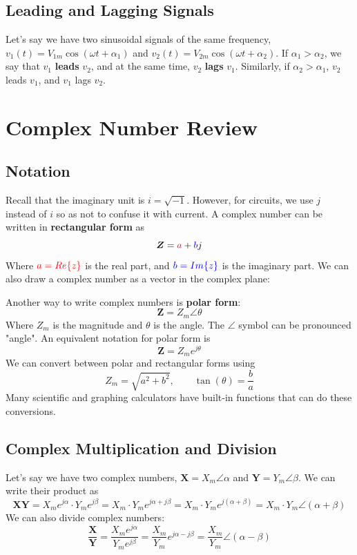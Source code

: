 \documentclass{article}
\begin{document}
\subsection*{Leading and Lagging Signals}
Let's say we have two sinusoidal signals of the same frequency, $v_1(t) = V_{1m}\cos(\omega t + \alpha_1)$ and $v_2(t) = V_{2m}\cos(\omega t + \alpha_2)$.
If $\alpha_1 > \alpha_2$, we say that $v_1$ \textbf{leads} $v_2$, and at the same time, $v_2$ \textbf{lags} $v_1$. Similarly, if $\alpha_2 > \alpha_1$, $v_2$ leads $v_1$, and $v_1$ lags $v_2$.


\section{Complex Number Review}
\subsection{Notation}
Recall that the imaginary unit is $i = \sqrt{-1}$. However, for circuits, we use $j$ instead of $i$ so as not to confuse it with current. A complex number can be written in \textbf{rectangular form} as
$$\bm{Z} = \mathcolor{red}{a} + \mathcolor{blue}{b}j$$
Where $ \mathcolor{red}{a = Re\{z\}}$ is the real part, and $\mathcolor{blue}{b = Im\{z\}}$ is the imaginary part. We can also draw a complex number as a vector in the complex plane:
\begin{figure}[H]
\centering
{}
\end{figure}
Another way to write complex numbers is \textbf{polar form}:
$$\bm{Z} = Z_m \angle \theta$$
Where $Z_m$ is the magnitude and $\theta$ is the angle. The $\angle$ symbol can be pronounced "angle". 
An equivalent notation for polar form is
$$\bm{Z} = Z_m e^{j\theta}$$
We can convert between polar and rectangular forms using
$$Z_m = \sqrt{a^2 + b^2}, \qquad \tan(\theta) = \frac{b}{a}$$
Many scientific and graphing calculators have built-in functions that can do these conversions.
\subsection{Complex Multiplication and Division}
Let's say we have two complex numbers, $\bm{X} = X_m \angle \alpha$ and $\bm{Y} = Y_m \angle \beta$. We can write their product as
$$\bm{X}\bm{Y} = X_me^{j\alpha}\cdot Y_me^{j\beta} = X_m\cdot Y_m e^{j\alpha + j\beta} = X_m \cdot Y_m e^{j(\alpha + \beta)} = X_m\cdot Y_m \angle (\alpha + \beta)$$
We can also divide complex numbers:
$$\frac{\bm{X}}{\bm{Y}} = \frac{X_me^{j\alpha}}{Y_me^{j\beta}} = \frac{X_m}{Y_m}e^{j\alpha - j\beta} = \frac{X_m}{Y_m} \angle (\alpha - \beta)$$
\end{document}
